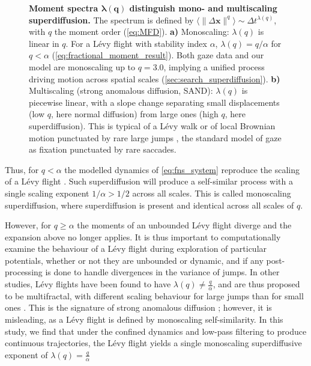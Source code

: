 \begin{figure}[htbp!]
	\centering
	\begin{subfigure}[t]{0.49\textwidth}
		\centering
	\end{subfigure}
	\hfill
	\begin{subfigure}[t]{0.49\textwidth}
		\centering
	\end{subfigure}
	\vspace{-1em}
	\caption{\textbf{Moment spectra $\bm{\lambda(q)}$ distinguish mono- and multiscaling superdiffusion.} The spectrum is defined by $\langle \|\Delta \mathbf{x}\|^q \rangle \sim \Delta t^{\lambda(q)}$, with $q$ the moment order (\cref{eq:MFD}). \textbf{a)} Monoscaling: $\lambda(q)$ is linear in $q$. For a Lévy flight with stability index $\alpha$, $\lambda(q)=q/\alpha$ for $q<\alpha$ (\cref{eq:fractional_moment_result}). Both gaze data and our model are monoscaling up to $q=3.0$, implying a unified process driving motion across spatial scales (\cref{sec:search_superdiffusion}). \textbf{b)} Multiscaling (strong anomalous diffusion, SAND): $\lambda(q)$ is piecewise linear, with a slope change separating small displacements (low $q$, here normal diffusion) from large ones (high $q$, here superdiffusion). This is typical of a Lévy walk or of local Brownian motion punctuated by rare large jumps \cite{wang_strong_2020}, the standard model of gaze as fixation punctuated by rare saccades.}
	\label{fig:SANDvsmono}
\end{figure}
Thus, for $q<\alpha$ the modelled dynamics of \cref{eq:fns_system} reproduce the scaling of a Lévy flight \cite{metzler_random_2000}. Such superdiffusion will produce a self-similar process with a single scaling exponent $1/\alpha > 1/2$ across all scales. This is called monoscaling superdiffusion, where superdiffusion is present and identical across all scales of $q$.

However, for $q\geq\alpha$ the moments of an unbounded Lévy flight diverge and the expansion above no longer applies. It is thus important to computationally examine the behaviour of a Lévy flight during exploration of particular potentials, whether or not they are unbounded or dynamic, and if any post-processing is done to handle divergences in the variance of jumps. In other studies, Lévy flights have been found to have $\lambda(q) \neq \frac{q}{\alpha}$, and are thus proposed to be multifractal, with different scaling behaviour for large jumps than for small ones \cite{dubkov_levy_2008, klafter_anomalous_2005}. This is the signature of strong anomalous diffusion \cite{castiglione_strong_1999}; however, it is misleading, as a Lévy flight is defined by monoscaling self-similarity. In this study, we find that under the confined dynamics and low-pass filtering to produce continuous trajectories, the Lévy flight yields a single monoscaling superdiffusive exponent of $\lambda(q) = \frac{q}{\alpha}$

